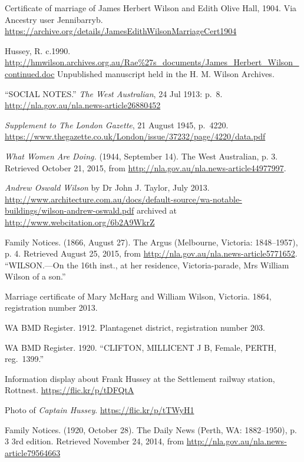 \begin{thebibliography}{999}
	Certificate of marriage of James Herbert Wilson and Edith Olive Hall, 1904.
	Via Ancestry user Jennibarryb.
	\url{https://archive.org/details/JamesEdithWilsonMarriageCert1904}

	Hussey, R. c.1990.
	\url{http://hmwilson.archives.org.au/Rae\%27s_documents/James_Herbert_Wilson_continued.doc}
	Unpublished manuscript held in the H. M. Wilson Archives.

	``SOCIAL NOTES.'' \emph{The West Australian}, 24 Jul 1913: p.\ 8.
	\url{http://nla.gov.au/nla.news-article26880452}

	\emph{Supplement to The London Gazette}, 21 August 1945, p.\ 4220.
	\url{https://www.thegazette.co.uk/London/issue/37232/page/4220/data.pdf}

	\emph{What Women Are Doing.} (1944, September 14). The West Australian, p. 3.
	Retrieved October 21, 2015, from \url{http://nla.gov.au/nla.news-article44977997}.

	\emph{Andrew Oswald Wilson} by Dr John J. Taylor, July 2013.
	\url{http://www.architecture.com.au/docs/default-source/wa-notable-buildings/wilson-andrew-oswald.pdf}
	archived at \url{http://www.webcitation.org/6b2A9WkrZ}

	Family Notices. (1866, August 27). The Argus (Melbourne, Victoria: 1848--1957), p. 4.
	Retrieved August 25, 2015, from \url{http://nla.gov.au/nla.news-article5771652}.
	``WILSON.---On the 16th inst., at her residence, Victoria-parade, Mrs William Wilson of a son.''

	Marriage certificate of Mary McHarg and William Wilson, Victoria. 1864, registration number 2013.

	WA BMD Register. 1912. Plantagenet district, registration number 203.

	WA BMD Register. 1920.
	``CLIFTON, MILLICENT J B, Female, PERTH, reg.\ 1399.''

	Information display about Frank Hussey at the Settlement railway station, Rottnest.
	\url{https://flic.kr/p/tDFQtA}

	Photo of \emph{Captain Hussey}. \url{https://flic.kr/p/tTWyH1}

	Family Notices. (1920, October 28). The Daily News (Perth, WA: 1882--1950), p. 3 3rd edition.
	Retrieved November 24, 2014, from \url{http://nla.gov.au/nla.news-article79564663}


\end{thebibliography}
